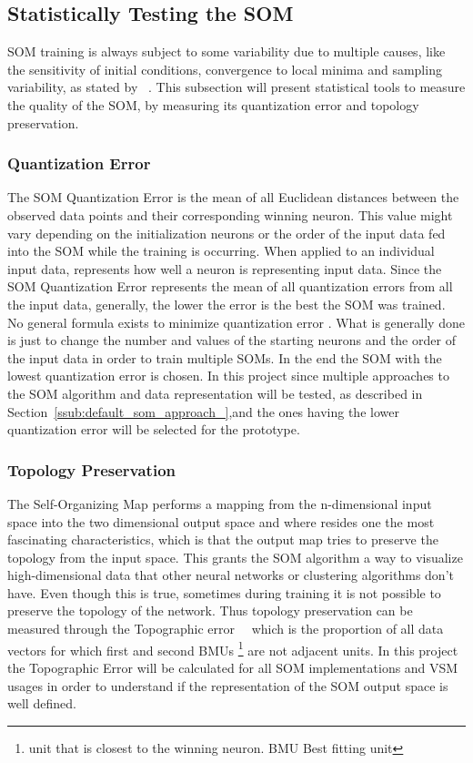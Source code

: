 \subsection{Statistically Testing the SOM} 
\label{sub:cluster_quality_testing}
SOM training is always subject to some variability due to multiple causes, like the sensitivity of initial conditions, convergence to local minima and sampling variability, as stated by ~\citet{Bodt}. This subsection will present statistical tools to measure the quality of the SOM, by measuring its quantization error and topology preservation.

\subsubsection{Quantization Error} 
\label{ssub:quantization_error}
The SOM Quantization Error is the mean of all Euclidean distances between the observed data points and their corresponding winning neuron. This value might vary depending on the initialization neurons or the order of the input data fed into the SOM while the training is occurring. When applied to an individual input data, represents how well a neuron is representing input data. Since the SOM Quantization Error represents the mean of all quantization errors from all the input data, generally, the lower the error is the best the SOM was trained.
\\
No general formula exists to minimize quantization error\cite{Bodt} . What is generally done is just to change the number and values of the starting neurons and the order of the input data in order to train multiple SOMs. In the end the SOM with the lowest quantization error is chosen.
In this project since multiple approaches to the SOM algorithm and data representation will be tested, as described in Section~\ref{ssub:default_som_approach_},and the ones having the lower quantization error will be selected for the prototype.

\subsubsection{Topology Preservation} 
\label{ssub:topology_preservation}
The Self-Organizing Map performs a mapping from the n-dimensional input space into the two dimensional output space and where resides one the most fascinating characteristics, which is that the output map tries to preserve the topology from the input space. This grants the SOM algorithm a way to visualize high-dimensional data that other neural networks or clustering algorithms don't have. Even though this is true, sometimes during training it is not possible to preserve the topology of the network.
Thus topology preservation can be measured through the Topographic error~~\citet{Kiviluoto1996} which is the proportion of all data vectors for which first and second BMUs \footnote{unit that is closest to the winning neuron. BMU Best fitting unit } are not adjacent units.
In this project the Topographic Error will be calculated for all SOM implementations and VSM usages in order to understand if the representation of the SOM output space is well defined.


